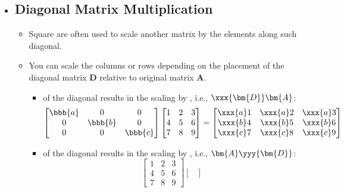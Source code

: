 \begin{itemize}
  \item[] 
  \subsection{Diagonal Matrix Multiplication}\label{Diagonal Matrix Multiplication}
  \begin{itemize}
    \item Square \hyperref[Diagonal and Triagnular Matrices]{} are often used to scale another matrix by the elements along such diagonal.
    \item You can scale the columns or rows depending on the placement of the diagonal matrix \(\bm{D}\) relative to original matrix \(\bm{A}\). 
      \begin{itemize}
        \item {} of the diagonal results in the scaling by , i.e., \(\xxx{\bm{D}}\bm{A}\):
        \[%
        \begin{bmatrix}
          \bbb{a} & 0 & 0 \\
          0 & \bbb{b} & 0 \\
          0 & 0 & \bbb{c}
        \end{bmatrix}
        \begin{bmatrix}
        1 & 2 & 3 \\
        4 & 5 & 6 \\
        7 & 8 & 9 
        \end{bmatrix}
        =
        \begin{bmatrix}
          \xxx{a}1 & \xxx{a}2 & \xxx{a}3 \\
          \xxx{b}4 & \xxx{b}5 & \xxx{b}6 \\
          \xxx{c}7 & \xxx{c}8 & \xxx{c}9 
          \end{bmatrix}
        \]%
        \item {} of the diagonal results in the scaling by , i.e., \(\bm{A}\yyy{\bm{D}}\):
        \[%
        \begin{bmatrix}
        1 & 2 & 3 \\
        4 & 5 & 6 \\
        7 & 8 & 9 
        \end{bmatrix}
        \begin{bmatrix}

\end{bmatrix}\]
\end{itemize}
\end{itemize}
\end{itemize}
